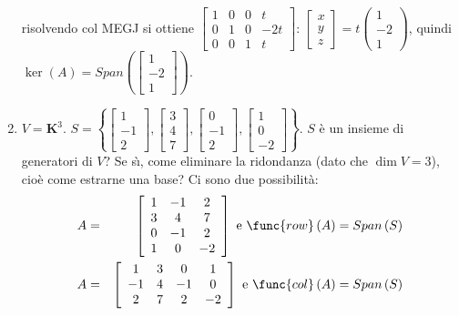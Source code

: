 \documentclass{article}
\begin{document}
\begin{enumerate}
risolvendo col MEGJ si ottiene $\left[ 
\begin{array}{cccc}
1 & 0 & 0 & t \\ 
0 & 1 & 0 & -2t \\ 
0 & 0 & 1 & t%
\end{array}%
\right] $: $\left[ 
\begin{array}{c}
x \\ 
y \\ 
z%
\end{array}%
\right] =t\left( 
\begin{array}{c}
1 \\ 
-2 \\ 
1%
\end{array}%
\right) $, quindi $\ker \left( A\right) =Span\left( \left[ 
\begin{array}{c}
1 \\ 
-2 \\ 
1%
\end{array}%
\right] \right) $.

\item $V=\mathbf{K}^{3}$. $S=\left\{ \left[ 
\begin{array}{c}
1 \\ 
-1 \\ 
2%
\end{array}%
\right] ,\left[ 
\begin{array}{c}
3 \\ 
4 \\ 
7%
\end{array}%
\right] ,\left[ 
\begin{array}{c}
0 \\ 
-1 \\ 
2%
\end{array}%
\right] ,\left[ 
\begin{array}{c}
1 \\ 
0 \\ 
-2%
\end{array}%
\right] \right\} $. $S$ \`{e} un insieme di generatori di $V$? Se s\`{\i},
come eliminare la ridondanza (dato che $\dim V=3$), cio\`{e} come estrarne
una base? Ci sono due possibilit\`{a}:%
\begin{eqnarray*}
A &=&\left[ 
\begin{array}{ccc}
1 & -1 & 2 \\ 
3 & 4 & 7 \\ 
0 & -1 & 2 \\ 
1 & 0 & -2%
\end{array}%
\right] \text{ e }\func{row}\left( A\right) =Span\left( S\right) \\
A &=&\left[ 
\begin{array}{cccc}
1 & 3 & 0 & 1 \\ 
-1 & 4 & -1 & 0 \\ 
2 & 7 & 2 & -2%
\end{array}%
\right] \text{ e }\func{col}\left( A\right) =Span\left( S\right)
\end{eqnarray*}
\end{enumerate}
\end{document}
